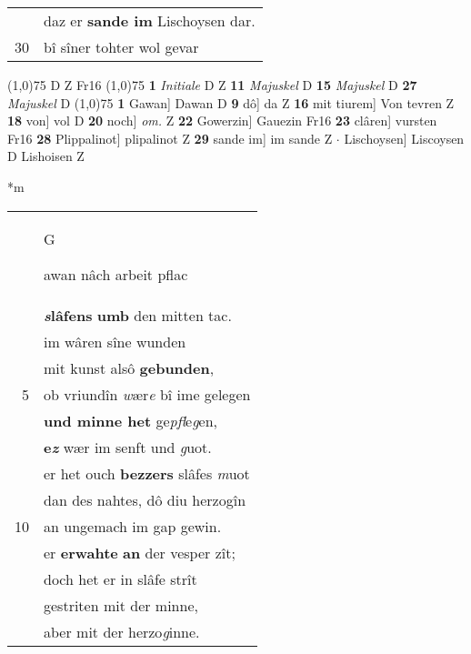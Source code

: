 \documentclass[8pt,a4paper,notitlepage]{article}
\begin{document}
\begin{table}[ht]
\begin{minipage}[t]{0.5\linewidth}
\begin{tabular}{rl}
 & daz er \textbf{sande im} Lischoysen dar.\\ 
30 & bî sîner tohter wol gevar\\ 
\end{tabular}
\scriptsize
\line(1,0){75} \newline
D Z Fr16 \newline
\line(1,0){75} \newline
\textbf{1} \textit{Initiale} D Z  \textbf{11} \textit{Majuskel} D  \textbf{15} \textit{Majuskel} D  \textbf{27} \textit{Majuskel} D  \newline
\line(1,0){75} \newline
\textbf{1} Gawan] Dawan D \textbf{9} dô] da Z \textbf{16} mit tiurem] Von tevren Z \textbf{18} von] vol D \textbf{20} noch] \textit{om.} Z \textbf{22} Gowerzin] Gauezin Fr16 \textbf{23} clâren] vursten Fr16 \textbf{28} Plippalinot] plipalinot Z \textbf{29} sande im] im sande Z  $\cdot$ Lischoysen] Liscoysen D Lishoisen Z \newline
\end{minipage}
\hspace{0.5cm}
\begin{minipage}[t]{0.5\linewidth}
\small
\begin{center}*m
\end{center}
\begin{tabular}{rl}
 & \begin{large}G\end{large}awan nâch arbeit pflac\\ 
 & \textbf{\textit{s}lâfens} \textbf{umb} den mitten tac.\\ 
 & im wâren sîne wunden\\ 
 & mit kunst alsô \textbf{gebunden},\\ 
5 & ob vriundîn \textit{w}ær\textit{e} bî ime gelegen\\ 
 & \textbf{und minne het} ge\textit{pfl}e\textit{g}en,\\ 
 & \textbf{e\textit{z}} wær im senft und \textit{g}uot.\\ 
 & er het ouch \textbf{bezzers} slâfes \textit{m}uot\\ 
 & dan des nahtes, dô diu herzogîn\\ 
10 & an ungemach im gap gewin.\\ 
 & er \textbf{erwahte} \textbf{an} der vesper zît;\\ 
 & doch het er in slâfe strît\\ 
 & gestriten mit der minne,\\ 
 & aber mit der herzo\textit{g}inne.\\ 

\end{tabular}
\end{minipage}
\end{table}
\end{document}
